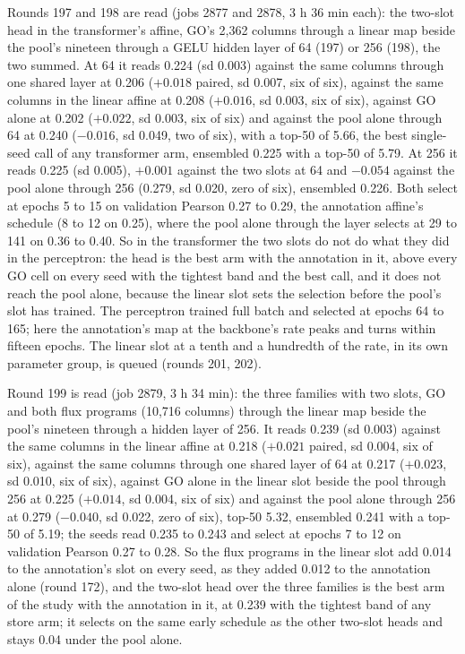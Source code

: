 Rounds 197 and 198 are read (jobs 2877 and 2878, 3 h 36 min each): the two-slot head
in the transformer's affine, GO's 2,362 columns through a linear map beside the pool's
nineteen through a GELU hidden layer of 64 (197) or 256 (198), the two summed. At 64
it reads 0.224 (sd 0.003) against the same columns through one shared layer at 0.206
($+0.018$ paired, sd 0.007, six of six), against the same columns in the linear affine
at 0.208 ($+0.016$, sd 0.003, six of six), against GO alone at 0.202 ($+0.022$, sd
0.003, six of six) and against the pool alone through 64 at 0.240 ($-0.016$, sd 0.049,
two of six), with a top-50 of 5.66, the best single-seed call of any transformer arm,
ensembled 0.225 with a top-50 of 5.79. At 256 it reads 0.225 (sd 0.005), $+0.001$
against the two slots at 64 and $-0.054$ against the pool alone through 256 (0.279,
sd 0.020, zero of six), ensembled 0.226. Both select at epochs 5 to 15 on validation
Pearson 0.27 to 0.29, the annotation affine's schedule (8 to 12 on 0.25), where the
pool alone through the layer selects at 29 to 141 on 0.36 to 0.40. So in the
transformer the two slots do not do what they did in the perceptron: the head is the
best arm with the annotation in it, above every GO cell on every seed with the tightest
band and the best call, and it does not reach the pool alone, because the linear slot
sets the selection before the pool's slot has trained. The perceptron trained full
batch and selected at epochs 64 to 165; here the annotation's map at the backbone's
rate peaks and turns within fifteen epochs. The linear slot at a tenth and a hundredth
of the rate, in its own parameter group, is queued (rounds 201, 202).

Round 199 is read (job 2879, 3 h 34 min): the three families with two slots, GO and
both flux programs (10,716 columns) through the linear map beside the pool's nineteen
through a hidden layer of 256. It reads 0.239 (sd 0.003) against the same columns in
the linear affine at 0.218 ($+0.021$ paired, sd 0.004, six of six), against the same
columns through one shared layer of 64 at 0.217 ($+0.023$, sd 0.010, six of six),
against GO alone in the linear slot beside the pool through 256 at 0.225 ($+0.014$, sd
0.004, six of six) and against the pool alone through 256 at 0.279 ($-0.040$, sd
0.022, zero of six), top-50 5.32, ensembled 0.241 with a top-50 of 5.19; the seeds
read 0.235 to 0.243 and select at epochs 7 to 12 on validation Pearson 0.27 to 0.28.
So the flux programs in the linear slot add 0.014 to the annotation's slot on every
seed, as they added 0.012 to the annotation alone (round 172), and the two-slot head
over the three families is the best arm of the study with the annotation in it, at
0.239 with the tightest band of any store arm; it selects on the same early schedule as
the other two-slot heads and stays 0.04 under the pool alone.

